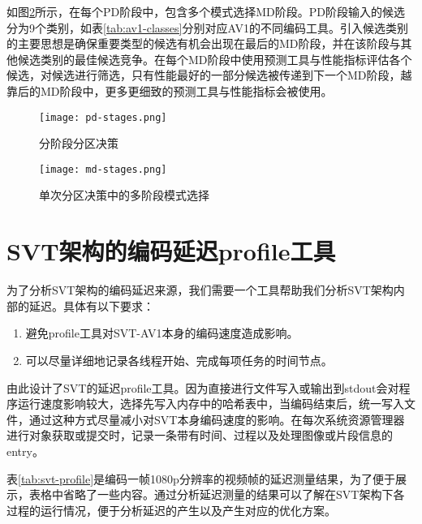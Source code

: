   如图\ref{fig:md}所示，在每个PD阶段中，包含多个模式选择MD阶段。PD阶段输入的候选分为9个类别，如表\ref{tab:av1-classes}分别对应AV1的不同编码工具。引入候选类别的主要思想是确保重要类型的候选有机会出现在最后的MD阶段，并在该阶段与其他候选类别的最佳候选竞争。在每个MD阶段中使用预测工具与性能指标评估各个候选，对候选进行筛选，只有性能最好的一部分候选被传递到下一个MD阶段，越靠后的MD阶段中，更多更细致的预测工具与性能指标会被使用。



  \begin{figure}[!htp]
    \centering
    \texttt{[image: pd-stages.png]}
    \caption{分阶段分区决策\cite{EncoderDesignSVTAV1}}
  \label{fig:pd}
  \end{figure}

  \begin{figure}[!htp]
    \centering
    \texttt{[image: md-stages.png]}
    \caption{单次分区决策中的多阶段模式选择\cite{EncoderDesignSVTAV1}}
  \label{fig:md}
  \end{figure}
\section{SVT架构的编码延迟profile工具} \label{sec:svt-profile}
  为了分析SVT架构的编码延迟来源，我们需要一个工具帮助我们分析SVT架构内部的延迟。具体有以下要求：
  \begin{enumerate} [label=\arabic*)]
    \item 避免profile工具对SVT-AV1本身的编码速度造成影响。
    \item 可以尽量详细地记录各线程开始、完成每项任务的时间节点。
  \end{enumerate}

  由此设计了SVT的延迟profile工具。因为直接进行文件写入或输出到stdout会对程序运行速度影响较大，选择先写入内存中的哈希表中，当编码结束后，统一写入文件，通过这种方式尽量减小对SVT本身编码速度的影响。在每次系统资源管理器进行对象获取或提交时，记录一条带有时间、过程以及处理图像或片段信息的entry。

  表\ref{tab:svt-profile}是编码一帧1080p分辨率的视频帧的延迟测量结果，为了便于展示，表格中省略了一些内容。通过分析延迟测量的结果可以了解在SVT架构下各过程的运行情况，便于分析延迟的产生以及产生对应的优化方案。

